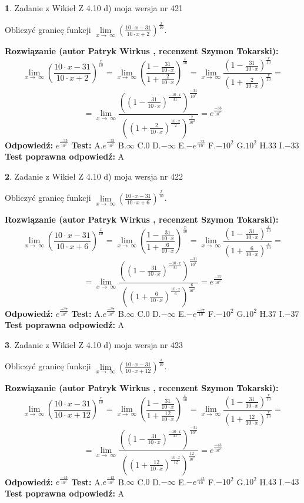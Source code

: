 \documentclass[12pt, a4paper]{article}
\theoremstyle{definition} %
\newtheorem{zad}{}
\newcommand{\zadStart}[1]{\begin{zad}#1\newline}
\newcommand{\zadStop}{\end{zad}}
\newcommand{\rozwStart}[2]{\noindent \textbf{Rozwiązanie (autor #1 , recenzent #2): }\newline}
\newcommand{\rozwStop}{\newline}
\newcommand{\odpStart}{\noindent \textbf{Odpowiedź:}\newline}
\newcommand{\odpStop}{\newline}
\newcommand{\testStart}{\noindent \textbf{Test:}\newline}
\newcommand{\testStop}{\newline}
\newcommand{\kluczStart}{\noindent \textbf{Test poprawna odpowiedź:}\newline}
\newcommand{\kluczStop}{\newline}
\begin{document}
\zadStart{Zadanie z Wikieł Z 4.10 d) moja wersja nr 421}


Obliczyć granicę funkcji  $\lim\limits_{x\to\ \infty}(\frac{10\cdot x-31}{10\cdot x+2})^{\frac{x}{10}}$.
\zadStop
\rozwStart{Patryk Wirkus}{Szymon Tokarski}
$$\lim\limits_{x\to\ \infty}(\frac{10\cdot x-31}{10\cdot x+2})^{\frac{x}{10}} = \lim\limits_{x\to\ \infty}(\frac{1-\frac{31}{10\cdot x}}{1+\frac{2}{10\cdot x}})^{\frac{x}{10}}=\lim\limits_{x\to\ \infty}\frac{(1-\frac{31}{10\cdot x})^{\frac{x}{10}}}{(1+\frac{2}{10\cdot x})^{\frac{x}{10}}}=$$
$$=\lim\limits_{x\to\ \infty}\frac{((1-\frac{31}{10\cdot x})^{\frac{-10\cdot x}{31}})^{\frac{-31}{10^{2}}}}{((1+\frac{2}{10\cdot x})^{\frac{10\cdot x}{2}})^{\frac{2}{10^{2}}}}=e^{\frac{-33}{10^{2}}}$$
\rozwStop
\odpStart
$e^{\frac{-33}{10^{2}}}$
\odpStop
\testStart
A.$e^{\frac{-33}{10^{2}}}$ B.$\infty$ C.$0$ D.$-\infty$ E.$-e^{\frac{-33}{10}}$
F.$-10^{2}$ G.$10^{2}$
H.$33$
I.$-33$
\testStop
\kluczStart
A
\kluczStop



\zadStart{Zadanie z Wikieł Z 4.10 d) moja wersja nr 422}


Obliczyć granicę funkcji  $\lim\limits_{x\to\ \infty}(\frac{10\cdot x-31}{10\cdot x+6})^{\frac{x}{10}}$.
\zadStop
\rozwStart{Patryk Wirkus}{Szymon Tokarski}
$$\lim\limits_{x\to\ \infty}(\frac{10\cdot x-31}{10\cdot x+6})^{\frac{x}{10}} = \lim\limits_{x\to\ \infty}(\frac{1-\frac{31}{10\cdot x}}{1+\frac{6}{10\cdot x}})^{\frac{x}{10}}=\lim\limits_{x\to\ \infty}\frac{(1-\frac{31}{10\cdot x})^{\frac{x}{10}}}{(1+\frac{6}{10\cdot x})^{\frac{x}{10}}}=$$
$$=\lim\limits_{x\to\ \infty}\frac{((1-\frac{31}{10\cdot x})^{\frac{-10\cdot x}{31}})^{\frac{-31}{10^{2}}}}{((1+\frac{6}{10\cdot x})^{\frac{10\cdot x}{6}})^{\frac{6}{10^{2}}}}=e^{\frac{-37}{10^{2}}}$$
\rozwStop
\odpStart
$e^{\frac{-37}{10^{2}}}$
\odpStop
\testStart
A.$e^{\frac{-37}{10^{2}}}$ B.$\infty$ C.$0$ D.$-\infty$ E.$-e^{\frac{-37}{10}}$
F.$-10^{2}$ G.$10^{2}$
H.$37$
I.$-37$
\testStop
\kluczStart
A
\kluczStop



\zadStart{Zadanie z Wikieł Z 4.10 d) moja wersja nr 423}


Obliczyć granicę funkcji  $\lim\limits_{x\to\ \infty}(\frac{10\cdot x-31}{10\cdot x+12})^{\frac{x}{10}}$.
\zadStop
\rozwStart{Patryk Wirkus}{Szymon Tokarski}
$$\lim\limits_{x\to\ \infty}(\frac{10\cdot x-31}{10\cdot x+12})^{\frac{x}{10}} = \lim\limits_{x\to\ \infty}(\frac{1-\frac{31}{10\cdot x}}{1+\frac{12}{10\cdot x}})^{\frac{x}{10}}=\lim\limits_{x\to\ \infty}\frac{(1-\frac{31}{10\cdot x})^{\frac{x}{10}}}{(1+\frac{12}{10\cdot x})^{\frac{x}{10}}}=$$
$$=\lim\limits_{x\to\ \infty}\frac{((1-\frac{31}{10\cdot x})^{\frac{-10\cdot x}{31}})^{\frac{-31}{10^{2}}}}{((1+\frac{12}{10\cdot x})^{\frac{10\cdot x}{12}})^{\frac{12}{10^{2}}}}=e^{\frac{-43}{10^{2}}}$$
\rozwStop
\odpStart
$e^{\frac{-43}{10^{2}}}$
\odpStop
\testStart
A.$e^{\frac{-43}{10^{2}}}$ B.$\infty$ C.$0$ D.$-\infty$ E.$-e^{\frac{-43}{10}}$
F.$-10^{2}$ G.$10^{2}$
H.$43$
I.$-43$
\testStop
\kluczStart
A
\kluczStop
\end{document}
